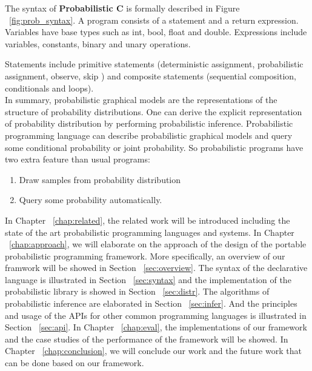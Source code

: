 The syntax of \textbf{Probabilistic C} is formally described in Figure ~\ref{fig:prob_syntax}. A program consists of a statement and a return expression. Variables have base types such as int, bool, float and double. Expressions include variables, constants, binary and unary operations.

Statements include primitive statements (deterministic assignment, probabilistic assignment, observe, skip ) and composite statements (sequential composition, conditionals and loops). \\

In summary, probabilistic graphical models are the representations of the structure of probability distributions. One can derive the explicit representation of probability distribution by performing probabilistic inference. Probabilistic programming language can describe probabilistic graphical models and query some conditional probability or joint probability. So probabilistic programs have two extra feature than usual programs: 
\begin{enumerate}
  \item Draw samples from probability distribution
  \item Query some probability automatically.
\end{enumerate}

In Chapter ~\ref{chap:related}, the related work will be introduced including the state of the art probabilistic programming languages and systems. In Chapter ~\ref{chap:approach}, we will elaborate on the approach of the design of the portable probabilistic programming framework. More specifically, an overview of our framwork will be showed in Section ~\ref{sec:overview}. The syntax of the declarative language is illustrated in Section ~\ref{sec:syntax} and the implementation of the probabilistic library is showed in Section ~\ref{sec:distr}. The algorithms of probabilistic inference are elaborated in Section ~\ref{sec:infer}. And the principles and usage of the APIs for other common programming languages is illustrated in Section ~\ref{sec:api}. In Chapter ~\ref{chap:eval}, the implementations of our framework and the case studies of the performance of the framework will be showed. In Chapter ~\ref{chap:conclusion}, we will conclude our work and the future work that can be done based on our framework. 

